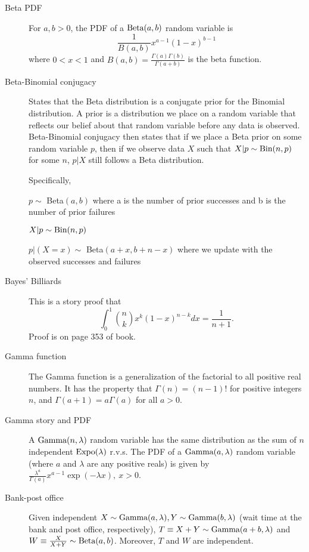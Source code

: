 \documentclass{article}
\begin{document}
\begin{description}
    \item[Beta PDF] For $a, b > 0$, the PDF of a $\textrm{Beta}(a, b)$ random variable is $$\frac{1}{B(a, b)}x^{a - 1}(1 - x)^{b - 1}$$
    where $0 < x < 1$ and $B(a, b) = \frac{\Gamma(a)\Gamma(b)}{\Gamma(a + b)}$ is the beta function.
    
    \item[Beta-Binomial conjugacy] States that the Beta distribution is a conjugate prior for the Binomial distribution. A prior is a distribution we place on a random variable that reflects our belief about that random variable before any data is observed. Beta-Binomial conjugacy then states that if we place a Beta prior on some random variable $p$, then if we observe data $X$ such that $X|p \sim \textrm{Bin}(n,p)$ for some $n$, $p|X$ still follows a Beta distribution. 
    
    Specifically,
    
    $p\sim$ Beta$(a,b)$ where a is the number of prior successes and b is the number of prior failures
    
    $X|p \sim \textrm{Bin}(n,p)$
    
    $p|(X=x)\sim$ Beta$(a+x,b+n-x)$ where we update with the observed successes and failures
    
    \item [Bayes' Billiards] This is a story proof that 
    $$\int_0^1\binom{n}{k}x^k(1 - x)^{n - k}dx = \frac{1}{n + 1}.$$
    Proof is on page 353 of book.
    
    \item[Gamma function] The Gamma function is a generalization of the factorial to all positive real numbers. It has the property that $\Gamma(n) = (n-1)!$ for positive integers $n$, and $\Gamma(a+1)=a\Gamma(a)$ for all $a > 0$. 
    
    \item[Gamma story and PDF] A $\textrm{Gamma}(n, \lambda)$ random variable has the same distribution as the sum of $n$ independent $\textrm{Expo}(\lambda)$ r.v.s. The PDF of a $\textrm{Gamma}(a,\lambda)$ random variable (where $a$ and $\lambda$ are any positive reals) is given by 
    $\frac{\lambda^a}{\Gamma(a)} x^{a-1}\exp(-\lambda x), \  x> 0$.
    
    \item[Bank-post office] Given independent $X \sim \textrm{Gamma}(a, \lambda), Y \sim \textrm{Gamma}(b, \lambda)$ (wait time at the bank and post office, respectively), $T \equiv X + Y \sim \textrm{Gamma}(a + b, \lambda)$ and $W \equiv \frac{X}{X + Y} \sim \textrm{Beta}(a, b)$. Moreover, $T$ and $W$ are independent.
\end{description}
\end{document}
